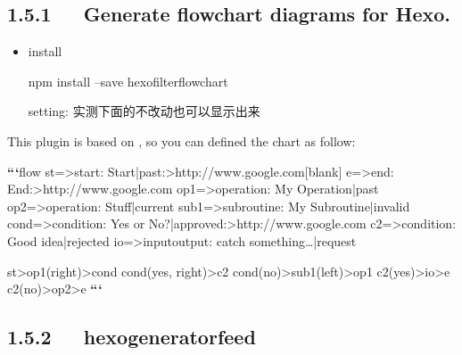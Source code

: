 \documentclass[letterpaper,12pt,english]{sphinxmanual}
\begin{document}
\subsection{1.5.1   Generate flowchart diagrams for Hexo.}
\label{\detokenize{001software/001install/001._u7f51_u7ad9/hexo:generate-flowchart-diagrams-for-hexo}}
\begin{itemize}
\item {} 
install

npm install –save hexo\sphinxhyphen{}filter\sphinxhyphen{}flowchart

setting: 实测下面的不改动也可以显示出来

\begin{sphinxVerbatim}[commandchars=\\\{\}]
  

   
\end{sphinxVerbatim}

\end{itemize}

This plugin is based on , so you can defined the chart as follow:

{\color{red}\bfseries{}``}{\color{red}\bfseries{}`}flow
st=>start: Start|past:>http://www.google.com{[}blank{]}
e=>end: End:>http://www.google.com
op1=>operation: My Operation|past
op2=>operation: Stuff|current
sub1=>subroutine: My Subroutine|invalid
cond=>condition: Yes
or No?|approved:>http://www.google.com
c2=>condition: Good idea|rejected
io=>inputoutput: catch something…|request

st\sphinxhyphen{}>op1(right)\sphinxhyphen{}>cond
cond(yes, right)\sphinxhyphen{}>c2
cond(no)\sphinxhyphen{}>sub1(left)\sphinxhyphen{}>op1
c2(yes)\sphinxhyphen{}>io\sphinxhyphen{}>e
c2(no)\sphinxhyphen{}>op2\sphinxhyphen{}>e
{\color{red}\bfseries{}``}{\color{red}\bfseries{}`}


\subsection{1.5.2   hexo\sphinxhyphen{}generator\sphinxhyphen{}feed}
\label{\detokenize{001software/001install/001._u7f51_u7ad9/hexo:hexo-generator-feed}}
\end{document}
